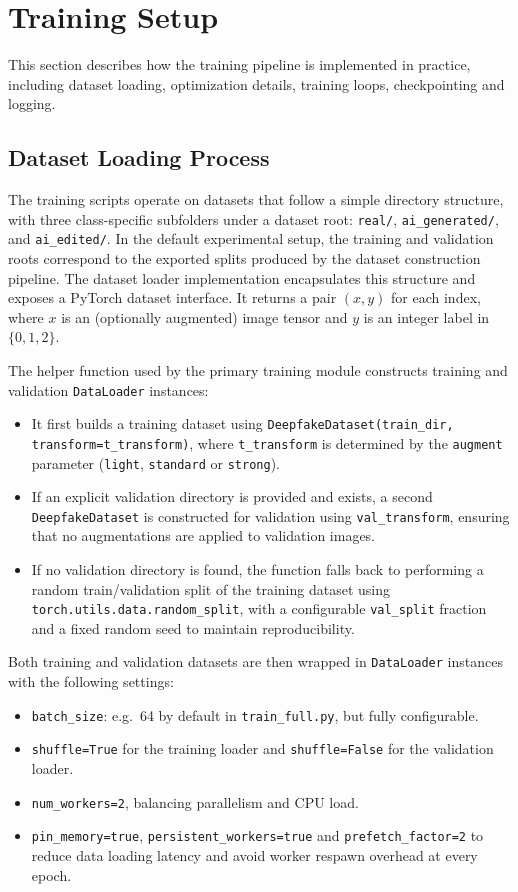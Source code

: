 \section{Training Setup}
\label{sec:training-setup}

This section describes how the training pipeline is implemented in practice, including dataset loading, optimization details, training loops, checkpointing and logging.

\subsection{Dataset Loading Process}

The training scripts operate on datasets that follow a simple directory structure, with three class-specific subfolders under a dataset root: \texttt{real/}, \texttt{ai\_generated/}, and \texttt{ai\_edited/}. In the default experimental setup, the training and validation roots correspond to the exported splits produced by the dataset construction pipeline. The dataset loader implementation encapsulates this structure and exposes a PyTorch dataset interface. It returns a pair $(x, y)$ for each index, where $x$ is an (optionally augmented) image tensor and $y$ is an integer label in $\{0, 1, 2\}$.

The helper function used by the primary training module constructs training and validation \texttt{DataLoader} instances:
\begin{itemize}
  \item It first builds a training dataset using \texttt{DeepfakeDataset(train\_dir, transform=t\_transform)}, where \texttt{t\_transform} is determined by the \texttt{augment} parameter (\texttt{light}, \texttt{standard} or \texttt{strong}).
  \item If an explicit validation directory is provided and exists, a second \texttt{DeepfakeDataset} is constructed for validation using \texttt{val\_transform}, ensuring that no augmentations are applied to validation images.
  \item If no validation directory is found, the function falls back to performing a random train/validation split of the training dataset using \texttt{torch.utils.data.random\_split}, with a configurable \texttt{val\_split} fraction and a fixed random seed to maintain reproducibility.
\end{itemize}

Both training and validation datasets are then wrapped in \texttt{DataLoader} instances with the following settings:
\begin{itemize}
  \item \texttt{batch\_size}: e.g.\ 64 by default in \texttt{train\_full.py}, but fully configurable.
  \item \texttt{shuffle=True} for the training loader and \texttt{shuffle=False} for the validation loader.
  \item \texttt{num\_workers=2}, balancing parallelism and CPU load.
  \item \texttt{pin\_memory=true}, \texttt{persistent\_workers=true} and \texttt{prefetch\_factor=2} to reduce data loading latency and avoid worker respawn overhead at every epoch.
\end{itemize}

